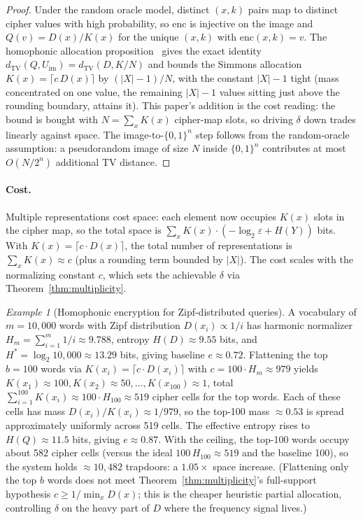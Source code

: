 \documentclass[conference]{IEEEtran}
\theoremstyle{definition}
\theoremstyle{plain}
\theoremstyle{remark}
\newtheorem{example}{Example}[section]
\newcommand{\enc}{\mathrm{enc}}
\newcommand{\TV}{d_{\mathrm{TV}}}
\newcommand{\B}{\{0,1\}}
\begin{document}
\begin{proof}
Under the random oracle model, distinct $(x, k)$ pairs map to distinct
cipher values with high probability, so $\enc$ is injective on the
image and $Q(v) = D(x)/K(x)$ for the unique $(x, k)$ with
$\enc(x, k) = v$.  The homophonic allocation
proposition~\cite[Prop.~4.1]{towell2026cipher} gives the exact
identity $\TV(Q, U_{\mathrm{im}}) = \TV(D, K/N)$ and bounds the Simmons
allocation $K(x) = \lceil c\,D(x) \rceil$ by $(|X|-1)/N$, with the
constant $|X|-1$ tight (mass concentrated on one value, the remaining
$|X|-1$ values sitting just above the rounding boundary, attains it).
This paper's addition is the cost reading: the bound is bought with
$N = \sum_x K(x)$ cipher-map slots, so driving $\delta$ down trades
linearly against space.  The image-to-$\B^n$ step follows from the
random-oracle assumption: a pseudorandom image of size $N$ inside
$\B^n$ contributes at most $O(N / 2^n)$ additional TV distance.
\end{proof}

\paragraph{Cost.}
Multiple representations cost space: each element now occupies $K(x)$
slots in the cipher map, so the total space is
$\sum_x K(x) \cdot (-\log_2 \varepsilon + H(Y))$ bits.  With
$K(x) = \lceil c \cdot D(x) \rceil$, the total number of
representations is $\sum_x K(x) \approx c$ (plus a rounding term bounded
by $|X|$).  The cost scales with the normalizing constant $c$, which
sets the achievable $\delta$ via Theorem~\ref{thm:multiplicity}.

\begin{example}[Homophonic encryption for Zipf-distributed queries]
\label{ex:homophonic}
A vocabulary of $m = 10{,}000$ words with Zipf distribution
$D(x_i) \propto 1/i$ has harmonic normalizer
$H_m = \sum_{i=1}^m 1/i \approx 9.788$, entropy
$H(D) \approx 9.55$ bits, and $H^* = \log_2 10{,}000 \approx 13.29$
bits, giving baseline $e \approx 0.72$.  Flattening the top
$b = 100$ words via $K(x_i) = \lceil c \cdot D(x_i) \rceil$ with
$c = 100 \cdot H_m \approx 979$ yields
$K(x_1) \approx 100, K(x_2) \approx 50, \ldots, K(x_{100}) \approx 1$,
total $\sum_{i=1}^{100} K(x_i) \approx 100 \cdot H_{100} \approx 519$
cipher cells for the top words.  Each of these cells has mass
$D(x_i)/K(x_i) \approx 1/979$, so the top-100 mass $\approx 0.53$ is
spread approximately uniformly across 519 cells.  The effective
entropy rises to $H(Q) \approx 11.5$ bits, giving $e \approx 0.87$.
With the ceiling, the top-100 words occupy about 582 cipher cells (versus
the ideal $100\,H_{100} \approx 519$ and the baseline 100), so the system
holds $\approx 10{,}482$ trapdoors: a $1.05\times$ space increase.
(Flattening only the top $b$ words does not meet
Theorem~\ref{thm:multiplicity}'s full-support hypothesis
$c \geq 1/\min_x D(x)$; this is the cheaper heuristic partial allocation,
controlling $\delta$ on the heavy part of $D$ where the frequency signal
lives.)
\end{example}
\end{document}
